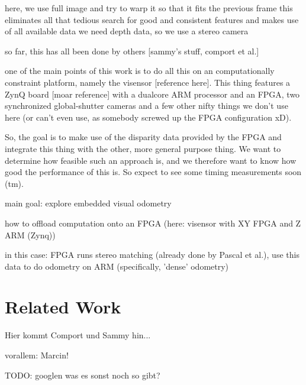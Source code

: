 here, we use full image and try to warp it so that it fits the previous frame
this eliminates all that tedious search for good and consistent features and
makes use of all available data we need depth data, so we use a stereo camera

so far, this has all been done by others [sammy's stuff, comport et al.]

one of the main points of this work is to do all this on an computationally
constraint platform, namely the visensor [reference here]. This thing features
a ZynQ board [moar reference] with a dualcore ARM processor and an FPGA, two
synchronized global-shutter cameras and a few other nifty things we don't use
here (or can't even use, as somebody screwed up the FPGA configuration xD).

So, the goal is to make use of the disparity data provided by the FPGA and
integrate this thing with the other, more general purpose thing. We want to
determine how feasible such an approach is, and we therefore want to know how
good the performance of this is. So expect to see some timing measurements soon
(tm).


main goal: explore embedded visual odometry

how to offload computation onto an FPGA (here: visensor with XY FPGA and Z ARM (Zynq))

in this case: FPGA runs stereo matching (already done by Pascal et al.), use this data to do odometry on ARM (specifically, 'dense' odometry)


\section{Related Work}
\label{sec:related_work}

Hier kommt Comport und Sammy hin...

vorallem: Marcin!

TODO: googlen was es sonst noch so gibt?
